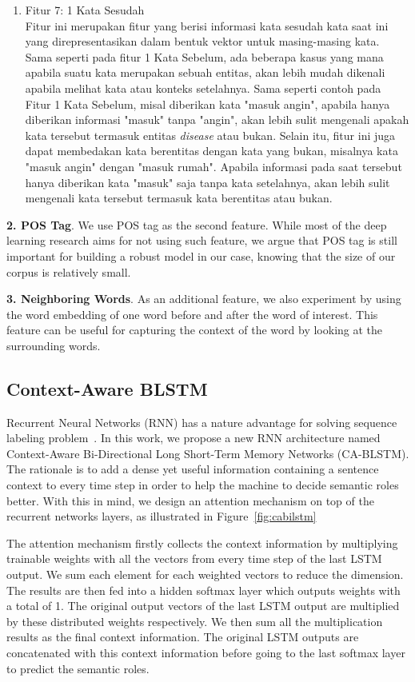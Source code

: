 \begin{enumerate}
	\item Fitur 7: 1 Kata Sesudah\\
	Fitur ini merupakan fitur yang berisi informasi kata sesudah kata saat ini yang direpresentasikan dalam bentuk vektor untuk masing-masing kata. Sama seperti pada fitur 1 Kata Sebelum, ada beberapa kasus yang mana apabila suatu kata merupakan sebuah entitas, akan lebih mudah dikenali apabila melihat kata atau konteks setelahnya. Sama seperti contoh pada Fitur 1 Kata Sebelum, misal diberikan kata "masuk angin", apabila hanya diberikan informasi "masuk" tanpa "angin", akan lebih sulit mengenali apakah kata tersebut termasuk entitas \textit{disease} atau bukan. Selain itu, fitur ini juga dapat membedakan kata berentitas dengan kata yang bukan, misalnya kata "masuk angin" dengan "masuk rumah". Apabila informasi pada saat tersebut hanya diberikan kata "masuk" saja tanpa kata setelahnya, akan lebih sulit mengenali kata tersebut termasuk kata berentitas atau bukan.
	
\end{enumerate}

\textbf{2. POS Tag}. We use POS tag as the second feature. While most of the deep learning research aims for not using such feature, we argue that POS tag is still important for building a robust model in our case, knowing that the size of our corpus is relatively small.

\textbf{3. Neighboring Words}. As an additional feature, we also experiment by using the word embedding of one word before and after the word of interest. This feature can be useful for capturing the context of the word by looking at the surrounding words.

\subsection{Context-Aware BLSTM}
Recurrent Neural Networks (RNN) has a nature advantage for solving sequence labeling problem~\cite{zhou2015end}. In this work, we propose a new RNN architecture named Context-Aware Bi-Directional Long Short-Term Memory Networks (CA-BLSTM). The rationale is to add a dense yet useful information containing a sentence context to every time step in order to help the machine to decide semantic roles better. With this in mind, we design an attention mechanism on top of the recurrent networks layers, as illustrated in Figure~\ref{fig:cabilstm} 

The attention mechanism firstly collects the context information by multiplying trainable weights with all the vectors from every time step of the last LSTM output. We sum each element for each weighted vectors to reduce the dimension. The results are then fed into a hidden softmax layer which outputs weights with a total of 1. The original output vectors of the last LSTM output are multiplied by these distributed weights respectively. We then sum all the multiplication results as the final context information. The original LSTM outputs are concatenated with this context information before going to the last softmax layer to predict the semantic roles. 

